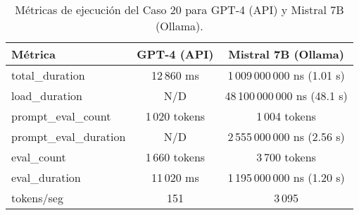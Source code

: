 
\begin{table}[h!]
\centering
\begin{tabular}{|l|c|c|}
\hline
\textbf{Métrica} & \textbf{GPT-4 (API)} & \textbf{Mistral 7B (Ollama)} \\
\hline
total\_duration & 12\,860 ms & 1\,009\,000\,000 ns (1.01 s) \\
load\_duration & N/D & 48\,100\,000\,000 ns (48.1 s) \\
prompt\_eval\_count & 1\,020 tokens & 1\,004 tokens \\
prompt\_eval\_duration & N/D & 2\,555\,000\,000 ns (2.56 s) \\
eval\_count & 1\,660 tokens & 3\,700 tokens \\
eval\_duration & 11\,020 ms & 1\,195\,000\,000 ns (1.20 s) \\
tokens/seg & 151 & 3\,095 \\
\hline
\end{tabular}
\caption{Métricas de ejecución del Caso 20 para GPT-4 (API) y Mistral 7B (Ollama).}
\end{table}
